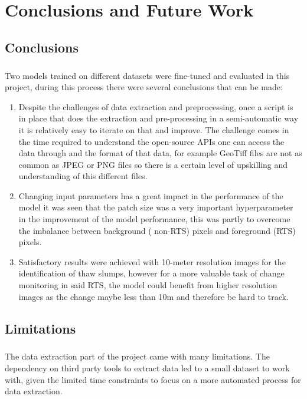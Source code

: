 \chapter{Conclusions and Future Work}
\section{Conclusions}
\paragraph{}
Two models trained on different datasets were fine-tuned and evaluated in this project, during this process there were several conclusions that can be made:
\begin{enumerate}
    \item{Despite the challenges of data extraction and preprocessing, once a script is in place that does the extraction and pre-processing in a semi-automatic way it is relatively easy to iterate on that and improve. The challenge comes in the time required to understand the open-source APIs one can access the data through and the format of that data, for example GeoTiff files are not as common as JPEG or PNG files so there is a certain level of upskilling and understanding of this different files.}
    
    \item{Changing input parameters has a great impact in the performance of the model it was seen that the patch size was a very important hyperparameter in the improvement of the model performance, this was partly to overcome the imbalance between background ( non-RTS) pixels and foreground (RTS) pixels.}
    
    \item{Satisfactory results were achieved with 10-meter resolution images for the identification of thaw slumps, however for a more valuable task of change monitoring in said RTS, the model could benefit from higher resolution images as the change maybe less than 10m and therefore be hard to track.}
    
\end{enumerate}

\section{Limitations}

\paragraph{}
The data extraction part of the project came with many limitations. The dependency on third party tools to extract data led to a small dataset to work with, given the limited time constraints to focus on a more automated process for data extraction.

